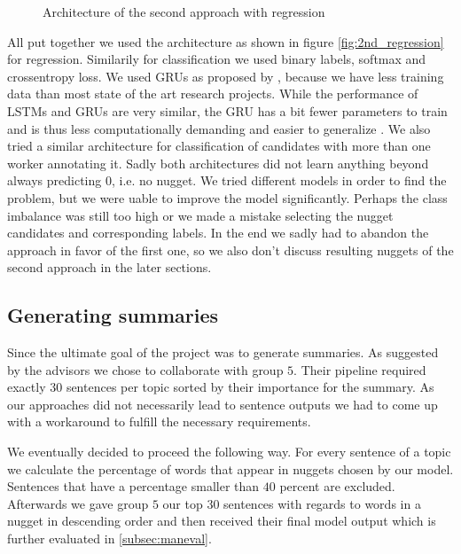 \documentclass{article}
\begin{document}
\begin{figure}
\caption{Architecture of the second approach with regression}
\end{figure}

All put together we used the architecture as shown in figure \ref{fig:2nd_regression} for regression. Similarily for classification we used binary labels, softmax and crossentropy loss.
We used GRUs as proposed by \cite{gru2014}, because we have less training data than most state of the art research projects. While the performance of LSTMs and GRUs are very similar, the GRU has a bit fewer parameters to train and is thus less computationally demanding and easier to generalize \cite{cnn_rnn_comparative2017}. We also tried a similar architecture for classification of candidates with more than one worker annotating it. Sadly both architectures did not learn anything beyond always predicting 0, i.e. no nugget. We tried different models in order to find the problem, but we were uable to improve the model significantly. Perhaps the class imbalance was still too high or we made a mistake selecting the nugget candidates and corresponding labels. In the end we sadly had to abandon the approach in favor of the first one, so we also don't discuss resulting nuggets of the second approach in the later sections.


\subsection{Generating summaries}
Since the ultimate goal of the project was to generate summaries. As suggested by the advisors we chose to collaborate with group $5$. Their pipeline required exactly 30 sentences per topic sorted by their importance for the summary. As our approaches did not necessarily lead to sentence outputs we had to come up with a workaround to fulfill the necessary requirements.  

We eventually decided to proceed the following way. For every sentence of a topic we calculate the percentage of words that appear in nuggets chosen by our model. Sentences that have a percentage smaller than $40$ percent are excluded. Afterwards we gave group $5$ our top $30$ sentences with regards to words in a nugget in descending order and then received their final model output which is further evaluated in \ref{subsec:maneval}.   
\end{document}
